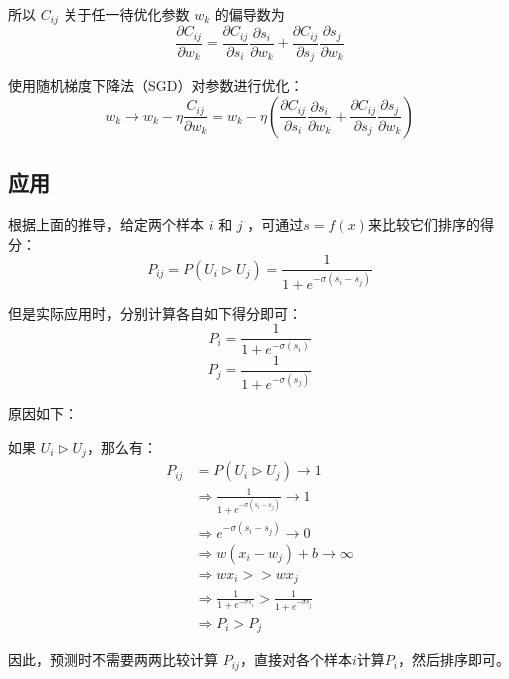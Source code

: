 \documentclass[12pt]{article}
\begin{document}
所以 $C_{ij}$ 关于任一待优化参数 $w_k$ 的偏导数为
$$
\frac{\partial C_{ij}}{\partial w_k} = \frac{\partial C_{ij}}{\partial s_i}\frac{\partial s_i}{\partial w_k} + \frac{\partial C_{ij}}{\partial s_j}\frac{\partial s_j}{\partial w_k}
$$

使用随机梯度下降法（SGD）对参数进行优化：
$$
w_k \rightarrow w_k - \eta\frac{C_{ij}}{\partial w_k} = w_k - \eta(\frac{\partial C_{ij}}{\partial s_i}\frac{\partial s_i}{\partial w_k} + \frac{\partial C_{ij}}{\partial s_j}\frac{\partial s_j}{\partial w_k})
$$

\subsection{应用}
根据上面的推导，给定两个样本 $i$ 和 $j$ ，可通过$s=f(x)$来比较它们排序的得分：
$$
P_{ij} = P(U_i \rhd U_j) = \frac{1}{1 + e^{-\sigma(s_i - s_j)}}
$$

但是实际应用时，分别计算各自如下得分即可：
$$
P_i = \frac{1}{1 + e^{-\sigma(s_i)}}
$$
$$
P_j = \frac{1}{1 + e^{-\sigma(s_j)}}
$$

原因如下：

如果 $U_i \rhd U_j$，那么有：
\begin{align}
P_{ij} &= P(U_i \rhd U_j) \rightarrow 1\\
    &\Rightarrow \frac{1}{1 + e^{-\sigma(s_i - s_j)}} \rightarrow 1 \\
    &\Rightarrow e^{-\sigma(s_i - s_j)} \rightarrow 0 \\
    &\Rightarrow w(x_i-w_j)+b \rightarrow \infty \\
    &\Rightarrow wx_i >> wx_j \\
    &\Rightarrow \frac{1}{1+e^{-\sigma s_i}} > \frac{1}{1+e^{-\sigma s_j}} \\
    &\Rightarrow P_i > P_j
\end{align}

因此，预测时不需要两两比较计算 $P_{ij}$，直接对各个样本$i$计算$P_i$，然后排序即可。



\end{document}
